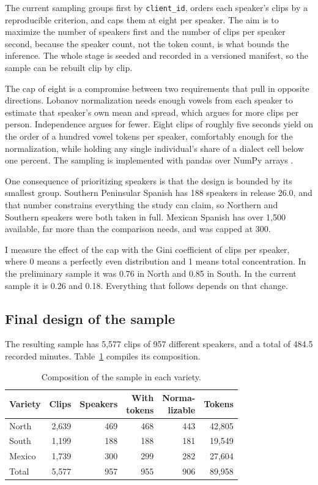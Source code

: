 \documentclass[11pt]{article}
\begin{document}
The current sampling groups first by \texttt{client\_id}, orders each speaker's
clips by a reproducible criterion, and caps them at eight per speaker. The aim is
to maximize the number of speakers first and the number of clips per speaker
second, because the speaker count, not the token count, is what bounds the
inference. The whole stage is seeded and recorded in a versioned manifest, so the
sample can be rebuilt clip by clip.

The cap of eight is a compromise between two requirements that pull in opposite
directions. Lobanov normalization needs enough vowels from each speaker to
estimate that speaker's own mean and spread, which argues for more clips per
person. Independence argues for fewer. Eight clips of roughly five seconds yield
on the order of a hundred vowel tokens per speaker, comfortably enough for the
normalization, while holding any single individual's share of a dialect cell
below one percent. The sampling is implemented with pandas \citep{mckinney2010}
over NumPy arrays \citep{harris2020}.

One consequence of prioritizing speakers is that the design is bounded by its
smallest group. Southern Peninsular Spanish has 188 speakers in release 26.0, and
that number constrains everything the study can claim, so Northern and Southern
speakers were both taken in full. Mexican Spanish has over 1,500 available, far
more than the comparison needs, and was capped at 300.

I measure the effect of the cap with the Gini coefficient of clips per speaker,
where 0 means a perfectly even distribution and 1 means total concentration. In
the preliminary sample it was 0.76 in North and 0.85 in South. In the current
sample it is 0.26 and 0.18. Everything that follows depends on that change.

\subsection{Final design of the sample}
\label{sec:sample}

The resulting sample has 5,577 clips of 957 different speakers, and a total of
484.5 recorded minutes. Table~\ref{tab:sample} compiles its composition.

\begin{table}[t]
\centering
\small
\setlength{\tabcolsep}{4pt}
\begin{tabular}{lrrrrr}
\toprule
Variety & Clips & Speakers & \makecell{With\\tokens} & \makecell{Norma-\\lizable} & Tokens \\
\midrule
North  & 2,639 & 469 & 468 & 443 & 42,805 \\
South  & 1,199 & 188 & 188 & 181 & 19,549 \\
Mexico & 1,739 & 300 & 299 & 282 & 27,604 \\
\midrule
Total  & 5,577 & 957 & 955 & 906 & 89,958 \\
\bottomrule
\end{tabular}
\caption{Composition of the sample in each variety.}
\label{tab:sample}
\end{table}
\end{document}
